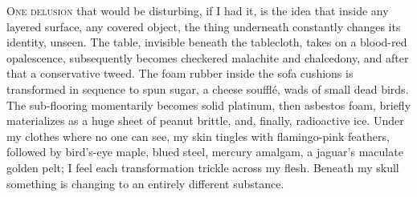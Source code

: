 
\lettrine{O}{ne delusion} that would be disturbing, if I had it, is the idea that
inside any layered surface, any covered object, the thing underneath
constantly changes its identity, unseen. The table, invisible beneath
the tablecloth, takes on a blood-red opalescence, subsequently becomes
checkered malachite and chalcedony, and after that a conservative tweed.
The foam rubber inside the sofa cushions is transformed in sequence to
spun sugar, a cheese soufflé, wads of small dead birds. The sub-flooring
momentarily becomes solid platinum, then asbestos foam, briefly
materializes as a huge sheet of peanut brittle, and, finally,
radioactive ice. Under my clothes where no one can see, my skin tingles
with flamingo-pink feathers, followed by bird's-eye maple, blued steel,
mercury amalgam, a jaguar's maculate golden pelt; I feel each
transformation trickle across my flesh. Beneath my skull something is
changing to an entirely different substance.

